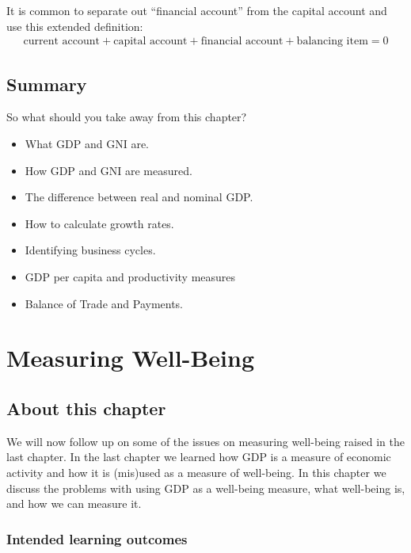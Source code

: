 \documentclass[]{book}
\providecommand{\tightlist}{%
  \setlength{\itemsep}{0pt}\setlength{\parskip}{0pt}}
\begin{document}
It is common to separate out ``financial account'' from the capital account and use this extended definition:
\begin{align}
  \text{current account}+\text{capital account}+\text{financial account}+\text{balancing item}=0
\end{align}

\hypertarget{summary}{%
\section{Summary}\label{summary}}

So what should you take away from this chapter?

\begin{itemize}
\tightlist
\item
  What GDP and GNI are.
\item
  How GDP and GNI are measured.
\item
  The difference between real and nominal GDP.
\item
  How to calculate growth rates.
\item
  Identifying business cycles.
\item
  GDP per capita and productivity measures
\item
  Balance of Trade and Payments.
\end{itemize}

\hypertarget{measuring-well-being}{%
\chapter{Measuring Well-Being}\label{measuring-well-being}}

\hypertarget{about-this-chapter-2}{%
\section{About this chapter}\label{about-this-chapter-2}}

We will now follow up on some of the issues on measuring well-being raised in the last chapter. In the last chapter we learned how GDP is a measure of economic activity and how it is (mis)used as a measure of well-being. In this chapter we discuss the problems with using GDP as a well-being measure, what well-being is, and how we can measure it.

\hypertarget{intended-learning-outcomes-2}{%
\subsection{Intended learning outcomes}\label{intended-learning-outcomes-2}}
\end{document}
